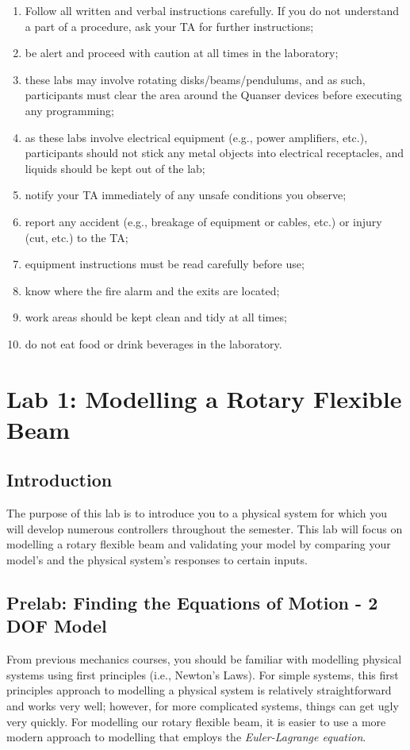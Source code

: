 \documentclass[12pt]{report}
\begin{document}
\begin{enumerate}
    \item Follow all written and verbal instructions carefully.  If you do not understand a part of a procedure, ask your TA for further instructions;
    \item be alert and proceed with caution at all times in the laboratory;
    \item these labs may involve rotating disks/beams/pendulums, and as such, participants must clear the area around the Quanser devices before executing any programming;
    \item as these labs involve electrical equipment (e.g., power amplifiers, etc.), participants should not stick any metal objects into electrical receptacles, and liquids should be kept out of the lab;
    \item notify your TA immediately of any unsafe conditions you observe;
    \item report any accident (e.g., breakage of equipment or cables, etc.) or injury (cut, etc.) to the TA;
    \item equipment instructions must be read carefully before use;
    \item know where the fire alarm and the exits are located;
    \item work areas should be kept clean and tidy at all times;
    \item do not eat food or drink beverages in the laboratory.
\end{enumerate}

\newpage
\section{Lab 1: Modelling a Rotary Flexible Beam} \label{section:lab1}
\subsection{Introduction} \label{subsection:lab1_intro}
The purpose of this lab is to introduce you to a physical system for which you will develop numerous controllers throughout the semester. This lab will focus on modelling a rotary flexible beam and validating your model by comparing your model's and the physical system's responses to certain inputs.
\subsection{Prelab: Finding the Equations of Motion - 2 DOF Model}\label{subsection:lab1_prelab}
From previous mechanics courses, you should be familiar with modelling physical systems using first principles (i.e., Newton's Laws). For simple systems, this first principles approach to modelling a physical system is relatively straightforward and works very well; however, for more complicated systems, things can get ugly very quickly. For modelling our rotary flexible beam, it is easier to use a more modern approach to modelling that employs the \emph{Euler-Lagrange equation}.
\end{document}
